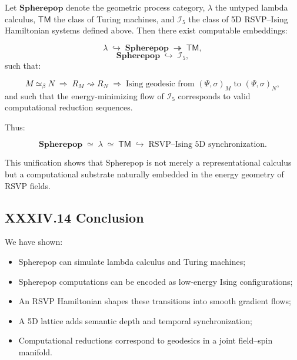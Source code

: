 \documentclass[11pt,letterpaper]{article}
\begin{document}
\begin{theorem}
Let $\mathbf{Spherepop}$ denote the geometric process category,  
$\lambda$ the untyped lambda calculus,  
$\mathsf{TM}$ the class of Turing machines,  
and $\mathcal{I}_5$ the class of 5D RSVP–Ising Hamiltonian systems defined above.  
Then there exist computable embeddings:

\[
\lambda \;\hookrightarrow\; \mathbf{Spherepop} \;\twoheadrightarrow\; \mathsf{TM},
\]
\[
\mathbf{Spherepop} \;\hookrightarrow\; \mathcal{I}_5,
\]
such that:

\[
M \simeq_{\beta} N
\;\Longrightarrow\;
R_M \rightsquigarrow R_N
\;\Longrightarrow\;
\text{Ising geodesic from } (\Psi,\sigma)_M \text{ to } (\Psi,\sigma)_N,
\]
and such that the energy-minimizing flow of $\mathcal{I}_5$ corresponds to valid computational reduction sequences.

Thus:

\[
\boxed{
\mathbf{Spherepop} \;\simeq\; \lambda \;\simeq\; \mathsf{TM}
\;\hookrightarrow\;
\text{RSVP--Ising 5D synchronization}.
}
\]

\end{theorem}

This unification shows that Spherepop is not merely a representational calculus but a computational substrate naturally embedded in the energy geometry of RSVP fields.

\subsection{XXXIV.14 Conclusion}

We have shown:

\begin{itemize}
    \item Spherepop can simulate lambda calculus and Turing machines;
    \item Spherepop computations can be encoded as low-energy Ising configurations;
    \item An RSVP Hamiltonian shapes these transitions into smooth gradient flows;
    \item A 5D lattice adds semantic depth and temporal synchronization;
    \item Computational reductions correspond to geodesics in a joint field–spin manifold.
\end{itemize}
\end{document}
